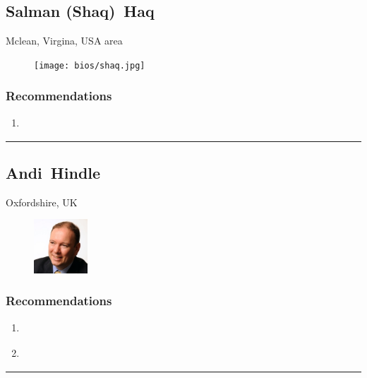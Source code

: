 \subsection{Salman (Shaq)~Haq} \textsf{Mclean, Virgina, USA area} \par \setlength{\columnsep}{0pt} \begin{figure} \centering \texttt{[image: bios/shaq.jpg]} \end{figure}  \subsubsection{Recommendations}\begin{enumerate}
\item \cite{Windley2005}
\end{enumerate}\noindent\rule{\textwidth}{0.2pt}

\subsection{Andi~Hindle} \textsf{Oxfordshire, UK} \par \setlength{\columnsep}{0pt} \begin{figure} \centering \includegraphics[width=0.18\textwidth]{bios/ahindle.jpg} \end{figure}  \subsubsection{Recommendations}\begin{enumerate}
\item \cite{Carlier2018}
\item \cite{Moore1991}
\end{enumerate}\noindent\rule{\textwidth}{0.2pt}

